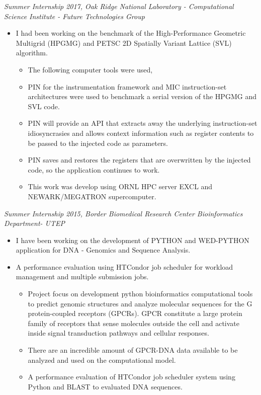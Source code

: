 \documentclass[margin]{res}
\begin{document}
\begin{resume}
{\sl Summer Internship 2017, Oak Ridge National Laboratory - Computational Science Institute - Future Technologies Group  }%
\begin{itemize}
\item I had been working on the benchmark of the High-Performance Geometric Multigrid (HPGMG) and PETSC 2D Spatially Variant Lattice (SVL) algorithm.
\begin{itemize}\itemsep -2pt
\item The following computer tools were used,  
\item PIN for the instrumentation framework and MIC instruction-set architectures were used to benchmark a serial version of the  HPGMG and SVL code.
\item PIN will provide an API that extracts away the underlying instruction-set idiosyncrasies and allows context information such as register contents to be passed to the injected code as parameters.
\item PIN saves and restores the registers that are overwritten by the injected code, so the application continues to work. 
\item This work was develop using ORNL HPC server EXCL and NEWARK/MEGATRON supercomputer.
\end{itemize}
\end{itemize}

{\sl Summer Internship 2015, Border Biomedical Research Center Bioinformatics Department- UTEP} %
\begin{itemize}\itemsep -2pt
\item I have been working on the development of PYTHON and WED-PYTHON application for DNA - Genomics and Sequence Analysis.
\item A performance evaluation using HTCondor job scheduler for workload management and multiple submission jobs. 
\begin{itemize}
\item Project focus on development python bioinformatics computational tools to predict genomic structures and analyze molecular sequences
for the G protein-coupled receptors (GPCRs). GPCR constitute a large protein family of receptors that sense molecules outside the cell and activate inside signal transduction pathways and cellular responses.
\item There are an incredible amount of GPCR-DNA data available to be analyzed and used on the computational model.
\item A performance evaluation of HTCondor job scheduler system using Python and BLAST to evaluated DNA sequences. 
\end{itemize}


\end{itemize}
\end{resume}
\end{document}
